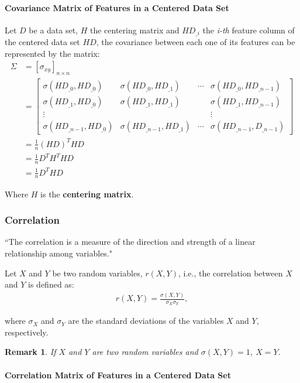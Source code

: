 \documentclass[12pt]{article}
\newtheorem{remark}{Remark}[section]
\begin{document}
\paragraph{Covariance Matrix of Features in a Centered Data Set}

Let $D$ be a data set, $H$ the centering matrix and $HD_{\_i}$ the {\em i-th} feature column of the centered data set $HD$, the covariance between each one of its features can be represented by the matrix:
\begin{align*}
\Sigma &= [\sigma_{xy}]_{n \times n} \\
&= \begin{bmatrix}
\sigma(HD_{\_0}, HD_{\_0}) & \sigma(HD_{\_0}, HD_{\_1}) & \cdots & \sigma(HD_{\_0}, HD_{\_n-1}) \\
\sigma(HD_{\_1}, HD_{\_0}) & \sigma(HD_{\_1}, HD_{\_1}) & & \sigma(HD_{\_1}, HD_{\_n-1}) \\
\vdots &&& \vdots \\
\sigma(HD_{\_n-1}, HD_{\_0}) & \sigma(HD_{\_n-1}, HD_{\_1}) & \cdots & \sigma(HD_{\_n-1}, D_{\_n-1})
\end{bmatrix} \\
&= \frac{1}{n} (HD)^T HD \\
&= \frac{1}{n} D^T H^T H D \\
 &= \frac{1}{n} D^T H D
\end{align*}

Where $H$ is the \textbf{centering matrix}.

\subsubsection{Correlation}

``The correlation is a measure of the direction and strength of a linear relationship among variables."

Let $X$ and $Y$ be two random variables, $r(X, Y)$, i.e., the correlation between $X$ and $Y$ is defined as:
\begin{align*}
	r(X, Y) = \frac{\sigma(X, Y)}{\sigma_X \sigma_Y},
\end{align*}

where $\sigma_X$ and $\sigma_Y$ are the standard deviations of the variables $X$ and $Y$, respectively.

\begin{remark}
	If $X$ and $Y$ are two random variables and $\sigma(X, Y) = 1$, $X=Y$.
\end{remark}

\paragraph{Correlation Matrix of Features in a Centered Data Set}
\end{document}
